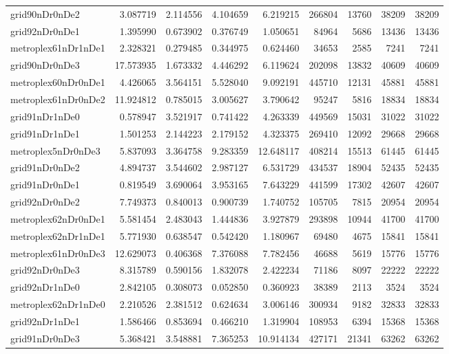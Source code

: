 \begin{longtable}{|l|r|r|r|r|r|r|r|r|}
grid90nDr0nDe2 & 3.087719 & 2.114556 & 4.104659 & 6.219215 & 266804 & 13760 & 38209 & 38209 \\
grid92nDr0nDe1 & 1.395990 & 0.673902 & 0.376749 & 1.050651 & 84964 & 5686 & 13436 & 13436 \\
metroplex61nDr1nDe1 & 2.328321 & 0.279485 & 0.344975 & 0.624460 & 34653 & 2585 & 7241 & 7241 \\
grid90nDr0nDe3 & 17.573935 & 1.673332 & 4.446292 & 6.119624 & 202098 & 13832 & 40609 & 40609 \\
metroplex60nDr0nDe1 & 4.426065 & 3.564151 & 5.528040 & 9.092191 & 445710 & 12131 & 45881 & 45881 \\
metroplex61nDr0nDe2 & 11.924812 & 0.785015 & 3.005627 & 3.790642 & 95247 & 5816 & 18834 & 18834 \\
grid91nDr1nDe0 & 0.578947 & 3.521917 & 0.741422 & 4.263339 & 449569 & 15031 & 31022 & 31022 \\
grid91nDr1nDe1 & 1.501253 & 2.144223 & 2.179152 & 4.323375 & 269410 & 12092 & 29668 & 29668 \\
metroplex5nDr0nDe3 & 5.837093 & 3.364758 & 9.283359 & 12.648117 & 408214 & 15513 & 61445 & 61445 \\
grid91nDr0nDe2 & 4.894737 & 3.544602 & 2.987127 & 6.531729 & 434537 & 18904 & 52435 & 52435 \\
grid91nDr0nDe1 & 0.819549 & 3.690064 & 3.953165 & 7.643229 & 441599 & 17302 & 42607 & 42607 \\
grid92nDr0nDe2 & 7.749373 & 0.840013 & 0.900739 & 1.740752 & 105705 & 7815 & 20954 & 20954 \\
metroplex62nDr0nDe1 & 5.581454 & 2.483043 & 1.444836 & 3.927879 & 293898 & 10944 & 41700 & 41700 \\
metroplex62nDr1nDe1 & 5.771930 & 0.638547 & 0.542420 & 1.180967 & 69480 & 4675 & 15841 & 15841 \\
metroplex61nDr0nDe3 & 12.629073 & 0.406368 & 7.376088 & 7.782456 & 46688 & 5619 & 15776 & 15776 \\
grid92nDr0nDe3 & 8.315789 & 0.590156 & 1.832078 & 2.422234 & 71186 & 8097 & 22222 & 22222 \\
grid92nDr1nDe0 & 2.842105 & 0.308073 & 0.052850 & 0.360923 & 38389 & 2113 & 3524 & 3524 \\
metroplex62nDr1nDe0 & 2.210526 & 2.381512 & 0.624634 & 3.006146 & 300934 & 9182 & 32833 & 32833 \\
grid92nDr1nDe1 & 1.586466 & 0.853694 & 0.466210 & 1.319904 & 108953 & 6394 & 15368 & 15368 \\
grid91nDr0nDe3 & 5.368421 & 3.548881 & 7.365253 & 10.914134 & 427171 & 21341 & 63262 & 63262 \\

\end{longtable}
